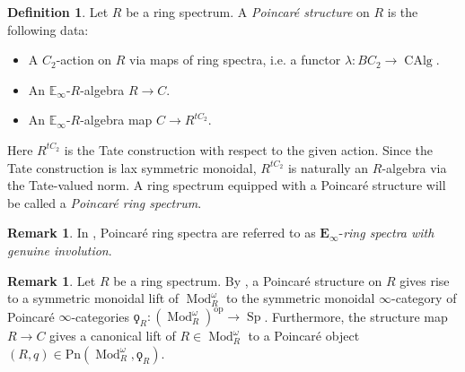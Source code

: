\documentclass{article}
\DeclareMathOperator{\CAlg}{CAlg} %
\DeclareMathOperator{\CAlgp}{CAlg^p} %
\DeclareMathOperator{\Catp}{Cat^p_\infty} %
\DeclareMathOperator{\Mod}{Mod} %
\DeclareMathOperator{\Spectra}{Sp} %
\newcommand{\EE}{\mathbb{E}}
\newcommand{\op}{\mathrm{op}} %
\theoremstyle{definition}
\newtheorem{definition}[equation]{Definition}
\newtheorem{remark}[equation]{Remark}
\newcommand{\Viktor}[1]{\todo{V: #1}}
\begin{document}
\begin{definition}
    \label{definition:poincare_ring_spectrum}
    Let $R$ be a ring spectrum. 
    A \emph{Poincaré structure} on $R$ is the following data:
    \begin{itemize}
        \item A $C_2$-action on $R$ via maps of ring spectra, i.e. a functor $\lambda: BC_2\rightarrow \CAlg$.
        \item An $ \EE_\infty $-$R$-algebra $R\rightarrow C$.
        \item An $ \EE_\infty $-$R$-algebra map $C\rightarrow R^{tC_2}$. 
    \end{itemize}
    Here $R^{tC_2}$ is the Tate construction with respect to the given action. 
    Since the Tate construction is lax symmetric monoidal, $R^{tC_2}$ is naturally an $R$-algebra via the Tate-valued norm. A ring spectrum equipped with a Poincaré structure will be called a \emph{Poincaré ring spectrum}. 
\end{definition}

\begin{remark}
    \label{remark:notational_difference_to_nine-authored_papers}
    In \cite[discussion immediately preceding Examples 5.4.10]{CDHHLMNNSI}, Poincaré ring spectra are referred to as $\mathbf{E}_\infty$-\emph{ring spectra with genuine involution}.
\end{remark}

\begin{remark}
    \label{remark:poincare_ring_spectra_to_modules_with_Poincare_structure}
    Let $R$ be a ring spectrum. 
    By \cite[Corollary 5.4.8]{CDHHLMNNSI}, a Poincaré structure on $R$ gives rise to a symmetric monoidal lift of $ \Mod_R^\omega $ to the symmetric monoidal $ \infty $-category of Poincaré $\infty$-categories $ \qoppa_R: (\Mod_R^\omega)^{\op}\rightarrow \Spectra $. 
    Furthermore, the structure map $ R \to C $ gives a canonical lift of $ R \in \Mod_R^\omega $ to a Poincaré object $ (R, q) \in \mathrm{Pn}\left(\Mod_R^\omega,\qoppa_R \right) $. 
\end{remark}
\end{document}
